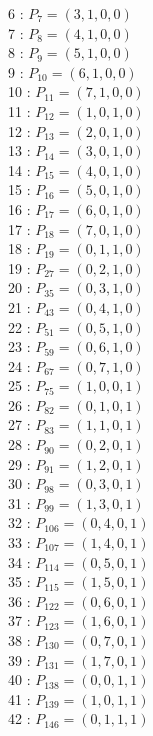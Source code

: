 \documentclass{article}
\begin{document}
{\begin{multicols}{3}
6 : $P_{7}=( 3, 1, 0, 0 )$\\
7 : $P_{8}=( 4, 1, 0, 0 )$\\
8 : $P_{9}=( 5, 1, 0, 0 )$\\
9 : $P_{10}=( 6, 1, 0, 0 )$\\
10 : $P_{11}=( 7, 1, 0, 0 )$\\
11 : $P_{12}=( 1, 0, 1, 0 )$\\
12 : $P_{13}=( 2, 0, 1, 0 )$\\
13 : $P_{14}=( 3, 0, 1, 0 )$\\
14 : $P_{15}=( 4, 0, 1, 0 )$\\
15 : $P_{16}=( 5, 0, 1, 0 )$\\
16 : $P_{17}=( 6, 0, 1, 0 )$\\
17 : $P_{18}=( 7, 0, 1, 0 )$\\
18 : $P_{19}=( 0, 1, 1, 0 )$\\
19 : $P_{27}=( 0, 2, 1, 0 )$\\
20 : $P_{35}=( 0, 3, 1, 0 )$\\
21 : $P_{43}=( 0, 4, 1, 0 )$\\
22 : $P_{51}=( 0, 5, 1, 0 )$\\
23 : $P_{59}=( 0, 6, 1, 0 )$\\
24 : $P_{67}=( 0, 7, 1, 0 )$\\
25 : $P_{75}=( 1, 0, 0, 1 )$\\
26 : $P_{82}=( 0, 1, 0, 1 )$\\
27 : $P_{83}=( 1, 1, 0, 1 )$\\
28 : $P_{90}=( 0, 2, 0, 1 )$\\
29 : $P_{91}=( 1, 2, 0, 1 )$\\
30 : $P_{98}=( 0, 3, 0, 1 )$\\
31 : $P_{99}=( 1, 3, 0, 1 )$\\
32 : $P_{106}=( 0, 4, 0, 1 )$\\
33 : $P_{107}=( 1, 4, 0, 1 )$\\
34 : $P_{114}=( 0, 5, 0, 1 )$\\
35 : $P_{115}=( 1, 5, 0, 1 )$\\
36 : $P_{122}=( 0, 6, 0, 1 )$\\
37 : $P_{123}=( 1, 6, 0, 1 )$\\
38 : $P_{130}=( 0, 7, 0, 1 )$\\
39 : $P_{131}=( 1, 7, 0, 1 )$\\
40 : $P_{138}=( 0, 0, 1, 1 )$\\
41 : $P_{139}=( 1, 0, 1, 1 )$\\
42 : $P_{146}=( 0, 1, 1, 1 )$\\

\end{multicols}}
\end{document}
